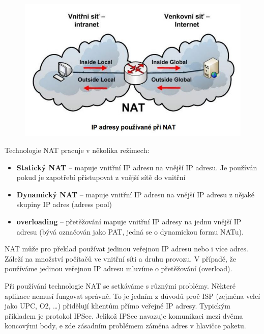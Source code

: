 \begin{figure}[H]
\centering
\includegraphics[width=1\textwidth]{assets/6_nat_ip}
\end{figure}
Technologie NAT pracuje v několika režimech:
\begin{itemize}
\item \textbf{Statický NAT} -- mapuje vnitřní IP adresu na vnější IP adresu. Je používán pokud je zapotřebí přistupovat z vnější sítě do vnitřní
\item \textbf{Dynamický NAT} -- mapuje vnitřní IP adresu na vnější IP adresu z nějaké skupiny IP adres (adress pool)
\item \textbf{overloading} -- přetěžování mapuje vnitřní IP adresy na jednu vnější IP adresu (bývá označován jako PAT, jedná se o dynamickou formu NATu).
\end{itemize}
NAT může pro překlad používat jedinou veřejnou IP adresu nebo i více adres. Záleží na množství počítačů ve vnitřní síti a druhu provozu. V případě, že používáme jedinou veřejnou IP adresu mluvíme o přetěžování (overload). 

Při používání technologie NAT se setkáváme s různými problémy. Některé aplikace nemusí fungovat správně. To je jedním z důvodů proč ISP (zejména velcí jako UPC, O2, …) přidělují klientům přímo veřejné IP adresy. Typickým příkladem je protokol IPSec. Jelikož IPSec navazuje komunikaci mezi dvěma koncovými body, e zde zásadním problémem záměna adres v hlavičce paketu. 

